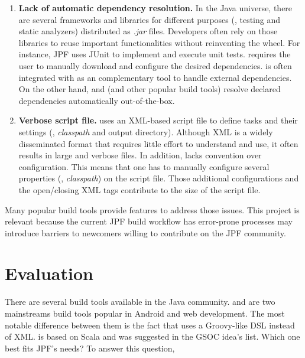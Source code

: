 \documentclass[a4paper, 12pt]{article}
\begin{document}
\begin{enumerate}

\item \textbf{Lack of automatic dependency resolution.}
In the Java universe, there are several frameworks and libraries for different
purposes (\eg, testing and static analyzers) distributed as \emph{.jar} files.
Developers often rely on those libraries to reuse important functionalities
without reinventing the wheel.
For instance, JPF uses JUnit to implement and execute unit tests.
\ant{} requires the user to manually download and configure the desired
dependencies.
\ant{} is often integrated with \ivy{}\cite{page:ivy} as an complementary
tool to handle external dependencies.
On the other hand, \gradle{} and \maven{} (and other popular build tools)
resolve declared dependencies automatically out-of-the-box.

\item \textbf{Verbose script file.}
\ant{} uses an XML-based script file to define tasks and their settings (\eg,
\emph{classpath} and output directory).
Although XML is a widely disseminated format that requires little effort to
understand and use, it often results in large and verbose files.
In addition, \ant{} lacks convention over configuration.
This means that one has to manually configure several properties (\eg,
\emph{classpath}) on the script file.
Those additional configurations and the open/closing XML tags contribute to the
size of the script file.

\end{enumerate}

Many popular build tools provide features to address those issues.
This project is relevant because the current JPF build workflow has error-prone
processes may introduce barriers to newcomers willing to contribute on the JPF
community.

\section{Evaluation}
\label{sec:evaluation}

There are several build tools available in the Java community.
\maven{} and \gradle{} are two mainstreams build tools popular in Android and
web development.
The most notable difference between them is the fact that \gradle{} uses a
Groovy-like DSL instead of XML.
\sbt{}\cite{page:sbt} is based on Scala and was suggested in the GSOC idea's
list\cite{page:jpf-gsoc18}.
Which one best fits JPF's needs?
To answer this question, 
\end{document}
